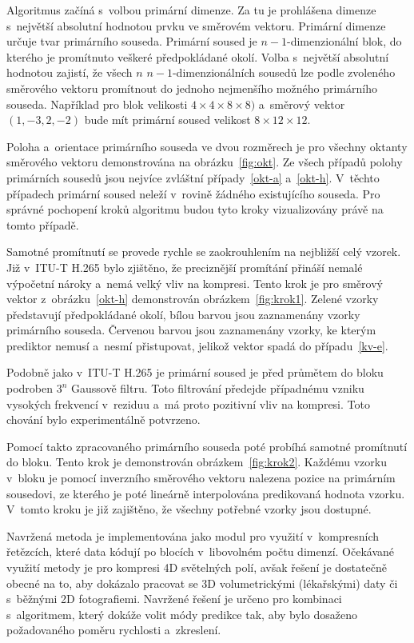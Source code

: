 Algoritmus začíná s~volbou pri\-már\-ní dimenze.
Za tu je prohlášena dimenze s~největší absolutní hodnotou prvku ve směr\-ovém vektoru.
Primární dimenze určuje tvar pri\-már\-ního souseda.
Primární soused je $n-1$-dimenzionální blok, do kterého je promítnuto veškeré předpokládané okolí.
Volba s~největší absolutní hodnotou zajistí, že všech $n$ $n-1$-dimenzionálních sousedů lze podle zvoleného směr\-ového vektoru promítnout do jednoho nejmenšího možného pri\-már\-ního souseda.
Například pro blok velikosti $4 \times 4 \times 8 \times 8)$ a~směr\-ový vektor $(1, -3, 2, -2)$ bude mít pri\-már\-ní soused velikost $8 \times 12 \times 12$.

Poloha a~orientace pri\-már\-ního souseda ve dvou roz\-měrech je pro všechny oktanty směr\-ového vektoru demonstrována na obrázku~\ref{fig:okt}.
Ze všech případů polohy pri\-már\-ních sousedů jsou nejvíce zvláštní případy~\ref{okt-a} a~\ref{okt-h}.
V~těchto případech pri\-már\-ní soused neleží v~rovině žádného existujícího souseda.
Pro správné pochopení kroků algoritmu budou tyto kroky vizualizovány právě na tomto případě.

Samotné promítnutí se provede rychle se zaokrouhlením na nejbližší celý vzorek.
Již v~ITU-T H.265 bylo zjištěno, že preciznější promítání přináší nemalé výpočetní nároky a~nemá vel\-ký vliv na kom\-pre\-si.
Tento krok je pro směr\-ový vektor z~obrázku~\ref{okt-h} demonstrován obrázkem~\ref{fig:krok1}.
Zelené vzorky představují předpokládané okolí, bílou barvou jsou zaznamenány vzorky primárního souseda.
Červenou barvou jsou zaznamenány vzorky, ke kterým pre\-diktor nemusí a~nesmí přistupovat, jelikož vektor spadá do případu~\ref{kv-e}.

Podobně jako v~ITU-T H.265 je pri\-már\-ní soused je před průmětem do bloku podroben $3^n$ Gaussově filtru.
Toto filtrování předejde případnému vzniku vysokých frekvencí v~reziduu a~má proto pozitivní vliv na kom\-pre\-si.
Toto chování bylo experimentálně potvrzeno.

Pomocí takto zpracovaného pri\-már\-ního souseda poté probíhá samotné promítnutí do bloku.
Tento krok je demonstrován obrázkem~\ref{fig:krok2}.
Každému vzorku v~bloku je pomocí inverzního směr\-ového vektoru na\-le\-zena pozice na pri\-már\-ním sousedovi, ze kterého je poté lineárně interpolována pre\-dikovaná hodnota vzorku.
V~tomto kroku je již zajištěno, že všechny potřebné vzorky jsou dostupné.

Navržená me\-to\-da je implementována jako modul pro využití v~kom\-pre\-sních řetězcích, které data kódují po blocích v~libovolném počtu dimenzí.
Očekávané využití me\-to\-dy je pro kom\-pre\-si 4D světelných polí, avšak řešení je dostatečně obecné na to, aby dokázalo pracovat se 3D volumetrickými (lékařskými) daty či s~běžnými 2D fotografiemi.
Navržené řešení je určeno pro kom\-bi\-na\-ci s~algoritmem, který dokáže volit módy pre\-dikce tak, aby bylo dosaženo požadovaného poměru rychlosti a~zkreslení.

